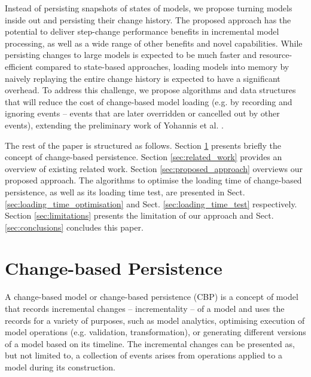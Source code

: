 \documentclass{llncs}
\begin{document}
Instead of persisting snapshots of states of models, we propose turning models inside out and persisting their change history. The proposed approach has the potential to deliver step-change performance benefits in incremental model processing, as well as a wide range of other benefits and novel capabilities. While persisting changes to large models is expected to be much faster and resource-efficient compared to state-based approaches, loading models into memory by naively replaying the entire change history is expected to have a significant overhead. To address this challenge, we propose algorithms and data structures that will reduce the cost of change-based model loading (e.g. by recording and ignoring events -- events that are later overridden or cancelled out by other events), extending the preliminary work of Yohannis et al. \cite{yohannis2017turning}.

The rest of the paper is structured as follows. Section \ref{sec:change_based_persistence} presents briefly the concept of change-based persistence. Section \ref{sec:related_work} provides an overview of existing related work. Section \ref{sec:proposed_approach} overviews our proposed approach. The algorithms to optimise the loading time of change-based persistence, as well as its loading time test, are presented in Sect. \ref{sec:loading_time_optimisation} and Sect. \ref{sec:loading_time_test} respectively. 
Section \ref{sec:limitations} presents the limitation of our approach and Sect. \ref{sec:conclusions} concludes this paper.

\section{Change-based Persistence}
\label{sec:change_based_persistence}
A change-based model or change-based persistence (CBP) is a concept of model that records incremental changes -- incrementality -- of a model and uses the records for a variety of purposes, such as model analytics, optimising execution of model operations (e.g. validation, transformation), or generating different versions of a model based on its timeline. The incremental changes can be presented as, but not limited to, a collection of events arises from operations applied to a model during its construction. 
\end{document}
